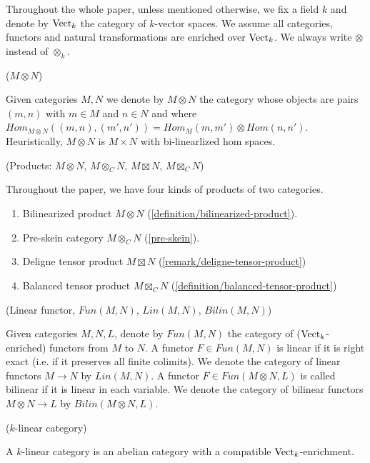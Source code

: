 Throughout the whole paper, unless mentioned otherwise, we fix a field $k$ and
denote by $\operatorname{Vect}_k$ the category of $k$-vector spaces. We assume all
categories, functors and natural transformations are enriched over $\operatorname{Vect}_k$.
We always write $\otimes$ instead of $\otimes_k$.

\begin{definition} \label{definition/bilinearized-product} ($M \otimes N$)

\noindent
Given categories $M,N$ we denote by $M\otimes N$ the category whose objects
are pairs $(m,n)$ with $m\in M$ and $n\in N$ and where $Hom_{M\otimes
N}((m,n),(m',n'))=Hom_M(m,m')\otimes Hom(n,n')$. Heuristically, $M \otimes N$
is $M \times N$ with bi-linearlized hom spaces.
\end{definition}

\begin{remark} (Products: $M \otimes N$, $M \otimes_C N$, $M \boxtimes N$, $M \boxtimes_C N$)

  \noindent Throughout the paper, we have four kinds of products of two categories.
  \begin{enumerate}
    \item Bilinearized product $M \otimes N$ (\ref{definition/bilinearized-product}).
    \item Pre-skein category $M\otimes_C N$ (\ref{pre-skein}).
    \item Deligne tensor product $M \boxtimes N$ (\ref{remark/deligne-tensor-product})
    \item Balanced tensor product $M \boxtimes_C N$ (\ref{definition/balanced-tensor-product})
  \end{enumerate}
\end{remark}

\begin{definition} (Linear functor, $Fun(M,N)$, $Lin(M,N)$, $Bilin(M,N)$)

  \noindent Given categories $M, N, L$, denote by $Fun(M,N)$ the category of
  ($\operatorname{Vect}_k$-enriched) functors from $M$ to $N$. A functor $F \in Fun(M,N)$ is
  linear if it is right exact (i.e. if it preserves all finite colimits). We
  denote the category of linear functors $M \to N$ by $Lin(M,N)$. A functor
  $F \in Fun(M \otimes N, L)$ is called bilinear if it is linear in each
  variable. We denote the category of bilinear functors $M\otimes N \to L$ by
  $Bilin(M\otimes N, L)$.
\end{definition}

\begin{definition} \label{definition/k-linear-category} ($k$-linear category) \cite{douglas/balanced-product}

\noindent A $k$-linear category is an abelian category with a compatible $\operatorname{Vect}_{k}$-enrichment.
\end{definition}

